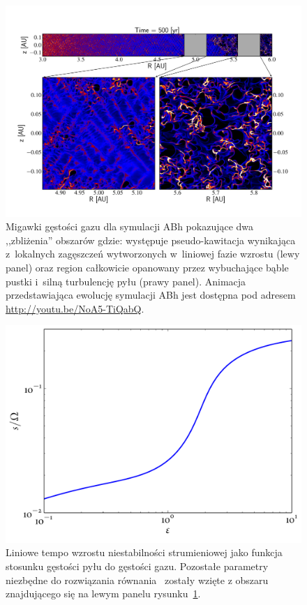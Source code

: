 \begin{figure} 
\centering
\includegraphics[width=0.98\linewidth]{figures/fig3}
\caption[Kawitacja w~symulacji ABh.]
  {Migawki gęstości gazu dla symulacji ABh pokazujące dwa ,,zbliżenia''
   obszarów gdzie: występuje pseudo-kawitacja wynikająca z~lokalnych zagęszczeń
   wytworzonych w~liniowej fazie wzrostu (lewy panel) oraz region całkowicie
   opanowany przez wybuchające bąble pustki i~silną turbulencję pyłu (prawy
   panel). Animacja przedstawiająca ewolucję symulacji ABh jest dostępna pod
   adresem \href{http://youtu.be/NoA5-TiQabQ}{http://youtu.be/NoA5-TiQabQ}.}
\label{fig3}
\end{figure}

\begin{figure}
   \centering
   \includegraphics[width=0.5\linewidth]{figures/growthAB}
   \caption[Liniowe tempo wzrostu niestabilności strumieniowej w~funkcji
   $\epsilon$.]
     {Liniowe tempo wzrostu niestabilności strumieniowej jako funkcja
      stosunku gęstości pyłu do gęstości gazu. Pozostałe parametry niezbędne do
      rozwiązania równania~ zostały wzięte z obszaru znajdującego
      się na lewym panelu rysunku~\ref{fig3}.}
   \label{fig2b}
\end{figure}


